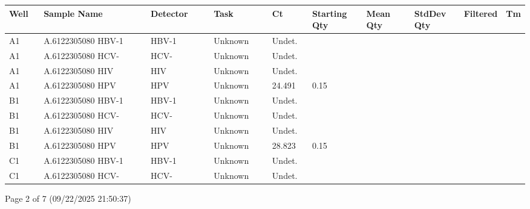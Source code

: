 \documentclass[UTF8,10pt,a4paper,fontset=fandol]{ctexart}
\begin{document}
\begin{small}
\begin{tabular}{|p{0.07\linewidth}|p{0.23\linewidth}|p{0.13\linewidth}|p{0.12\linewidth}|p{0.08\linewidth}|p{0.11\linewidth}|p{0.10\linewidth}|p{0.10\linewidth}|p{0.08\linewidth}|p{0.06\linewidth}|}
\hline
\textbf{Well} & \textbf{Sample Name} & \textbf{Detector} & \textbf{Task} & \textbf{Ct} & \textbf{Starting Qty} & \textbf{Mean Qty} & \textbf{StdDev Qty} & \textbf{Filtered} & \textbf{Tm}\\
\hline
A1 & A.6122305080 HBV-1 & HBV-1 & Unknown & Undet. & & & & &\\
\hline
A1 & A.6122305080 HCV- & HCV- & Unknown & Undet. & & & & &\\
\hline
A1 & A.6122305080 HIV & HIV & Unknown & Undet. & & & & &\\
\hline
A1 & A.6122305080 HPV & HPV & Unknown & 24.491 & 0.15 & & & &\\
\hline
B1 & A.6122305080 HBV-1 & HBV-1 & Unknown & Undet. & & & & &\\
\hline
B1 & A.6122305080 HCV- & HCV- & Unknown & Undet. & & & & &\\
\hline
B1 & A.6122305080 HIV & HIV & Unknown & Undet. & & & & &\\
\hline
B1 & A.6122305080 HPV & HPV & Unknown & 28.823 & 0.15 & & & &\\
\hline
C1 & A.6122305080 HBV-1 & HBV-1 & Unknown & Undet. & & & & &\\
\hline
C1 & A.6122305080 HCV- & HCV- & Unknown & Undet. & & & & &\\
\hline
\end{tabular}
\end{small}


\hfill Page 2 of 7 (09/22/2025 21:50:37)

\newpage
\end{document}
